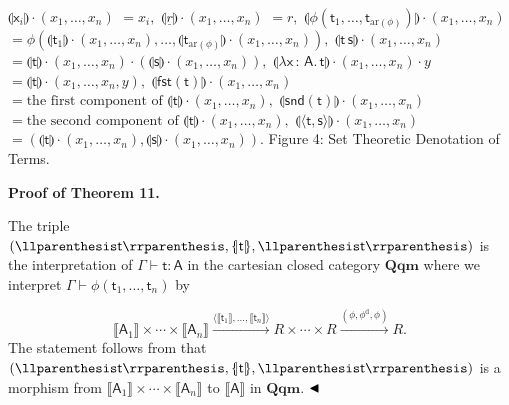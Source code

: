     $\displaystyle\llparenthesis\mathsf{x}_{i}\rrparenthesis\cdot(x_{1},\ldots,x_{n})$ $\displaystyle=x_{i},$     $\displaystyle\llparenthesis\underline{r}\rrparenthesis\cdot(x_{1},\ldots,x_{n})$ $\displaystyle=r,$     $\displaystyle\llparenthesis\phi(\mathsf{t}_{1},\ldots,\mathsf{t}_{\mathrm{ar}(%
\phi)})\rrparenthesis\cdot(x_{1},\ldots,x_{n})$ $\displaystyle=\phi(\llparenthesis\mathsf{t}_{1}\rrparenthesis\cdot(x_{1},%
\ldots,x_{n}),\ldots,\llparenthesis\mathsf{t}_{\mathrm{ar}(\phi)}%
\rrparenthesis\cdot(x_{1},\ldots,x_{n})),$     $\displaystyle\llparenthesis\mathsf{t}\,\mathsf{s}\rrparenthesis\cdot(x_{1},%
\ldots,x_{n})$ $\displaystyle=\llparenthesis\mathsf{t}\rrparenthesis\cdot(x_{1},\ldots,x_{n})%
\cdot(\llparenthesis\mathsf{s}\rrparenthesis\cdot(x_{1},\ldots,x_{n})),$     $\displaystyle\llparenthesis\lambda\mathsf{x}\,{:}\,\mathsf{A}.\,\mathsf{t}%
\rrparenthesis\cdot(x_{1},\ldots,x_{n})\cdot y$ $\displaystyle=\llparenthesis\mathsf{t}\rrparenthesis\cdot(x_{1},\ldots,x_{n},y),$     $\displaystyle\llparenthesis\mathsf{fst}(\mathsf{t})\rrparenthesis\cdot(x_{1},%
\ldots,x_{n})$ $\displaystyle=\text{the first component of }\llparenthesis\mathsf{t}%
\rrparenthesis\cdot(x_{1},\ldots,x_{n}),$     $\displaystyle\llparenthesis\mathsf{snd}(\mathsf{t})\rrparenthesis\cdot(x_{1},%
\ldots,x_{n})$ $\displaystyle=\text{the second component of }\llparenthesis\mathsf{t}%
\rrparenthesis\cdot(x_{1},\ldots,x_{n}),$     $\displaystyle\llparenthesis\langle\mathsf{t},\mathsf{s}\rangle\rrparenthesis%
\cdot(x_{1},\ldots,x_{n})$ $\displaystyle=(\llparenthesis\mathsf{t}\rrparenthesis\cdot(x_{1},\ldots,x_{n})%
,\llparenthesis\mathsf{s}\rrparenthesis\cdot(x_{1},\ldots,x_{n})).$    
Figure 4: Set Theoretic Denotation of Terms.\par
 
 
 
\par\medskip\noindent\textbf{Proof of Theorem 11.}\par
 
 
The triple $(\llparenthesis\mathsf{t}\rrparenthesis,\{\hskip-2.25pt|\mathsf{t}|\hskip-2.25%
pt\},\llparenthesis\mathsf{t}\rrparenthesis)$ is the interpretation of $\mathsf{\Gamma}\vdash\mathsf{t}:\mathsf{A}$ in the cartesian closed category $\mathbf{Qqm}$ where we interpret $\mathsf{\Gamma}\vdash\phi(\mathsf{t}_{1},\ldots,\mathsf{t}_{n})$ by\par
    \[\llbracket\mathsf{A}_{1}\rrbracket\times\cdots\times\llbracket\mathsf{A}_{n}%
\rrbracket\xrightarrow{\langle\llbracket\mathsf{t}_{1}\rrbracket,\ldots,%
\llbracket\mathsf{t}_{n}\rrbracket\rangle}R\times\cdots\times R\xrightarrow{(%
\phi,\phi^{\mathrm{d}},\phi)}R.\]    
The statement follows from that $(\llparenthesis\mathsf{t}\rrparenthesis,\{\hskip-2.25pt|\mathsf{t}|\hskip-2.25%
pt\},\llparenthesis\mathsf{t}\rrparenthesis)$ is a morphism from $\llbracket\mathsf{A}_{1}\rrbracket\times\cdots\times\llbracket\mathsf{A}_{n}\rrbracket$ to $\llbracket\mathsf{A}\rrbracket$ in $\mathbf{Qqm}$. $\hfill\blacktriangleleft$\par
 
